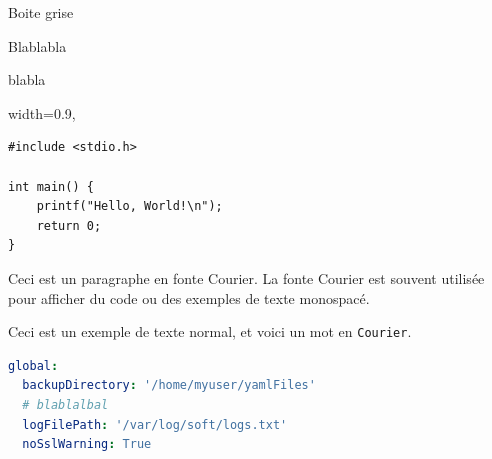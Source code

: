Boite grise
\begin{shadebox}
Blablabla
\end{shadebox}

\begin{center}
\begin{tcolorbox}[colback=gray!10,
                  colframe=gray!50,
                  width=0.9\textwidth,
                  title=Remarque
                 ]
blabla                 
\end{tcolorbox}
\end{center}

\begin{center}
                  width=0.9\textwidth,
\end{center}



\begin{verbatim}
#include <stdio.h>

int main() {
    printf("Hello, World!\n");
    return 0;
}
\end{verbatim}

\ttfamily
Ceci est un paragraphe en fonte Courier. La fonte Courier est souvent utilisée pour afficher du code ou des exemples de texte monospacé.
\normalfont

Ceci est un exemple de texte normal, et voici un mot en \texttt{Courier}.

\begin{lstlisting}[language=yaml, basicstyle=\ttfamily, frame=single]
global:
  backupDirectory: '/home/myuser/yamlFiles'
  # blablalbal
  logFilePath: '/var/log/soft/logs.txt'
  noSslWarning: True
\end{lstlisting}


